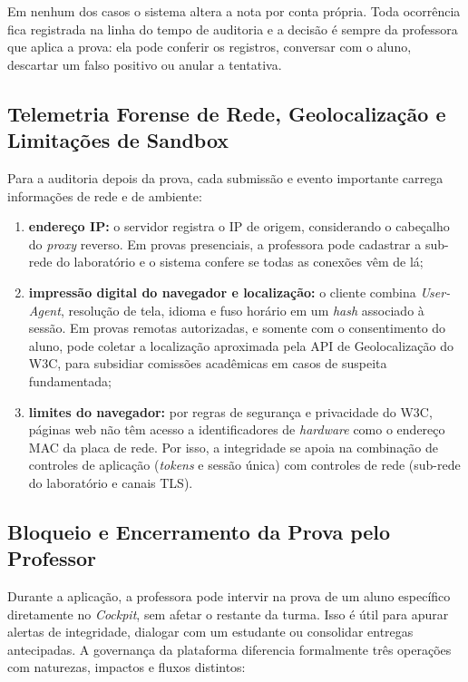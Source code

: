 Em nenhum dos casos o sistema altera a nota por conta própria. Toda ocorrência fica registrada na linha do tempo de auditoria e a decisão é sempre da professora que aplica a prova: ela pode conferir os registros, conversar com o aluno, descartar um falso positivo ou anular a tentativa.

\subsection{Telemetria Forense de Rede, Geolocalização e Limitações de Sandbox}
\label{sec:telemetria-forense}

Para a auditoria depois da prova, cada submissão e evento importante carrega informações de rede e de ambiente:

\begin{enumerate}
    \item \textbf{endereço IP:} o servidor registra o IP de origem, considerando o cabeçalho do \textit{proxy} reverso. Em provas presenciais, a professora pode cadastrar a sub-rede do laboratório e o sistema confere se todas as conexões vêm de lá;
    \item \textbf{impressão digital do navegador e localização:} o cliente combina \textit{User-Agent}, resolução de tela, idioma e fuso horário em um \textit{hash} associado à sessão. Em provas remotas autorizadas, e somente com o consentimento do aluno, pode coletar a localização aproximada pela API de Geolocalização do W3C, para subsidiar comissões acadêmicas em casos de suspeita fundamentada;
    \item \textbf{limites do navegador:} por regras de segurança e privacidade do W3C, páginas web não têm acesso a identificadores de \textit{hardware} como o endereço MAC da placa de rede. Por isso, a integridade se apoia na combinação de controles de aplicação (\textit{tokens} e sessão única) com controles de rede (sub-rede do laboratório e canais TLS).
\end{enumerate}

\subsection{Bloqueio e Encerramento da Prova pelo Professor}
\label{sec:bloqueio-docente}

Durante a aplicação, a professora pode intervir na prova de um aluno específico diretamente no \textit{Cockpit}, sem afetar o restante da turma. Isso é útil para apurar alertas de integridade, dialogar com um estudante ou consolidar entregas antecipadas. A governança da plataforma diferencia formalmente três operações com naturezas, impactos e fluxos distintos:

